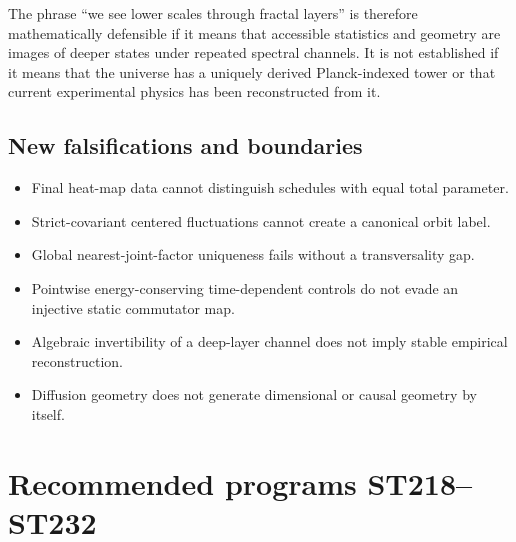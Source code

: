 \documentclass[11pt,a4paper]{article}
\begin{document}
The phrase ``we see lower scales through fractal layers'' is therefore mathematically defensible if it means that accessible statistics and geometry are images of deeper states under repeated spectral channels. It is not established if it means that the universe has a uniquely derived Planck-indexed tower or that current experimental physics has been reconstructed from it.

\subsection{New falsifications and boundaries}

\begin{itemize}
\item Final heat-map data cannot distinguish schedules with equal total parameter.
\item Strict-covariant centered fluctuations cannot create a canonical orbit label.
\item Global nearest-joint-factor uniqueness fails without a transversality gap.
\item Pointwise energy-conserving time-dependent controls do not evade an injective static commutator map.
\item Algebraic invertibility of a deep-layer channel does not imply stable empirical reconstruction.
\item Diffusion geometry does not generate dimensional or causal geometry by itself.
\end{itemize}

\section{Recommended programs ST218--ST232}
\end{document}
